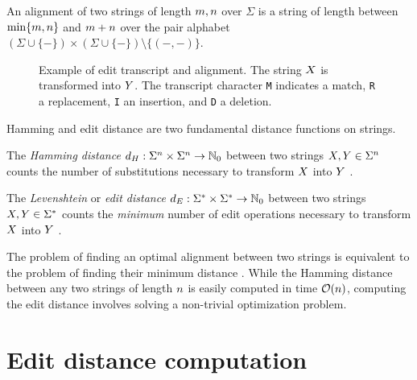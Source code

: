 \begin{definition}[Alignment]
\label{def:alignment}
An alignment of two strings of length $m,n$ over $\Sigma$ is a string of length between $\text{min}\{m,n\}$ and $m+n$ over the pair alphabet $(\Sigma \cup \{ - \}) \times (\Sigma \cup \{ - \}) \setminus \{ (-,-) \} $.
\end{definition}

\begin{figure}[t]
\begin{center}
\caption[Edit transcript and alignment]{Example of edit transcript and alignment. The string $X$ is transformed into $Y$. The transcript character \texttt{M} indicates a match, \texttt{R} a replacement, \texttt{I} an insertion, and \texttt{D} a deletion.
}
\label{fig:edit-transcript}

\end{center}
\end{figure}

Hamming and edit distance are two fundamental distance functions on strings.

\begin{definition}
\label{def:hamming}
The \emph{Hamming distance} $d_H : \Sigma^{n} \times \Sigma^{n} \rightarrow \mathbb {N}_0$ between two strings $X,Y \in \Sigma^{n}$ counts the number of substitutions necessary to transform $X$ into $Y$ \citep{Hamming1950}.
\end{definition}
\begin{definition}
\label{def:edit}
The \emph{Levenshtein} or \emph{edit distance} $d_E : \Sigma^{*} \times \Sigma^{*} \rightarrow \mathbb {N}_0$ between two strings $X,Y \in \Sigma^{*}$ counts the \emph{minimum} number of edit operations necessary to transform $X$ into $Y$ \citep{Levenshtein1966}.
\end{definition}

The problem of finding an optimal alignment between two strings is equivalent to the problem of finding their minimum distance \citep{Gusfield1997}.
While the Hamming distance between any two strings of length $n$ is easily computed in time $\mathcal{O}(n)$, computing the edit distance involves solving a non-trivial optimization problem.

\section{Edit distance computation}

